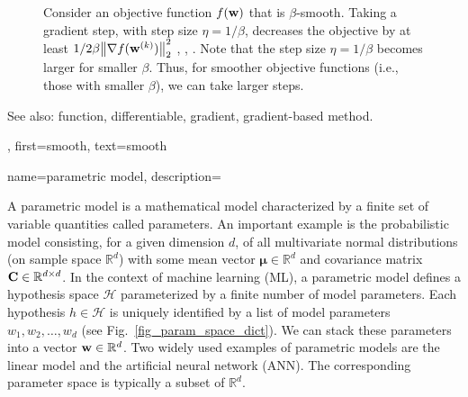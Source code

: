 {{{\begin{figure}[H]
\begin{center}
	    	\end{center}
	    	\caption{Consider an objective function $f({\bf w})$ that is $\beta$-smooth. 
	    		Taking a gradient step, with step size $\eta = 1/\beta$, decreases the 
	    		objective by at least ${1}/{2\beta}\mleft\lVert \nabla f({\bf w}^{(k)}) \mright\rVert_{2}^{2}$ \cite{nesterov04}, \cite{CvxBubeck2015}, \cite{CvxAlgBertsekas}. 
	    		Note that the step size $\eta = 1/\beta$ becomes larger for smaller $\beta$. Thus, 
	    		for smoother objective functions (i.e., those with smaller $\beta$), 
				we can take larger steps. \label{fig_gd_smooth_dict}}
	    	\end{figure}
		See also: function, differentiable, gradient,  gradient-based method.},
	first={smooth},
	text={smooth}
}

{name={parametric model},
	description={
		A parametric model is a mathematical model characterized 
		by a finite set of variable quantities called parameters.
		An important example is the probabilistic model consisting, for a given 
		dimension $d$, of all multivariate normal distributions (on sample space 
		$\mathbb{R}^{d}$) with some mean vector 
		${\bm \mu} \in \mathbb{R}^{d}$ and covariance matrix ${\bf C} \in \mathbb{R}^{d \times d}$.
        In the context of machine learning (ML), a parametric model defines a 
		hypothesis space $\mathcal{H}$ parameterized by a finite number of model parameters.
        Each hypothesis $h \in \mathcal{H}$ is uniquely identified by a 
		list of model parameters $w_{1}, w_{2}, \ldots, w_{d}$ 
		(see Fig.~\ref{fig_param_space_dict}). We can stack these parameters into a 
		vector ${\bf w} \in \mathbb{R}^{d}$. Two widely used examples 
		of parametric models are the linear model and the artificial neural network (ANN). The 
		corresponding parameter space is typically a subset of $\mathbb{R}^{d}$.
		\begin{figure}[H]
			\begin{center}
\end{center}
\end{figure}}}}
